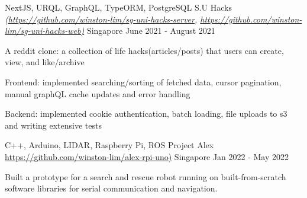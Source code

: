 

\begin{cventries}
  \cventry
  {NextJS, URQL, GraphQL, TypeORM, PostgreSQL} %
  {S.U Hacks \textmd{\em\tiny(\url{https://github.com/winston-lim/sg-uni-hacks-server}, \url{https://github.com/winston-lim/sg-uni-hacks-web)}}} %
  {Singapore} %
  {June 2021 - August 2021} %
  {
    \begin{cvitems}
      \item {A reddit clone: a collection of life hacks(articles/posts) that users can create, view, and like/archive }
      \item {Frontend: implemented searching/sorting of fetched data, cursor pagination, manual graphQL cache updates and error handling }
      \item {Backend: implemented cookie authentication, batch loading, file uploads to s3 and writing extensive tests }
    \end{cvitems}
  }
  \cventry
  {C++, Arduino, LIDAR, Raspberry Pi, ROS} %
  {Project Alex \url{https://github.com/winston-lim/alex-rpi-uno)}} %
  {Singapore} %
  {Jan 2022 - May 2022} %
  {
    \begin{cvitems}
      \item {Built a prototype for a search and rescue robot running on built-from-scratch software libraries for serial communication and navigation.}
    \end{cvitems}
  }

\end{cventries}